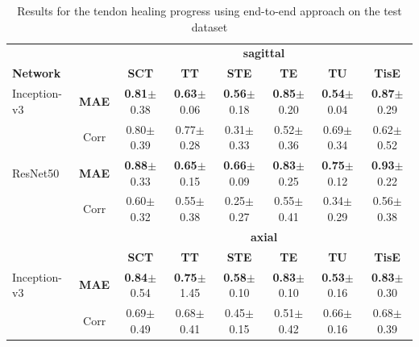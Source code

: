 \begin{table}[h]
	\footnotesize
	\setlength{\tabcolsep}{1pt}
	\centering
	\caption{Results for the tendon healing progress using end-to-end approach on the test dataset}
	\label{cross-validation}
	\vspace{-0.5cm}
	\begin{tabular}{lc||c|c|c|c|c|c}
		& & \multicolumn{6}{c}{\normalsize{\textbf{sagittal}}} \\
		\textbf{Network} & & \textbf{SCT} & \textbf{TT} & \textbf{STE} & \textbf{TE} & \textbf{TU} & \textbf{TisE} \\ \hline
		Inception-v3 & \textbf{MAE} & \textbf{0.81}$\pm$0.38 & \textbf{0.63}$\pm$0.06 & \textbf{0.56}$\pm$0.18 & \textbf{0.85}$\pm$0.20 & \textbf{0.54}$\pm$0.04 & \textbf{0.87}$\pm$0.29 \\
		& Corr & 0.80$\pm$0.39 & 0.77$\pm$0.28 & 0.31$\pm$0.33 & 0.52$\pm$0.36 & 0.69$\pm$0.34 & 0.62$\pm$0.52 \\ \hline
		ResNet50 & \textbf{MAE} & \textbf{0.88}$\pm$0.33 & \textbf{0.65}$\pm$0.15 & \textbf{0.66}$\pm$0.09 & \textbf{0.83}$\pm$0.25 & \textbf{0.75}$\pm$0.12 & \textbf{0.93}$\pm$0.22 \\
		& Corr & 0.60$\pm$0.32 & 0.55$\pm$0.38 & 0.25$\pm$0.27 & 0.55$\pm$0.41 & 0.34$\pm$0.29 & 0.56$\pm$0.38 \\
		\hline \hline
		& & \multicolumn{6}{c}{\normalsize{\textbf{axial}}} \\
		& & \textbf{SCT} & \textbf{TT} & \textbf{STE} & \textbf{TE} & \textbf{TU} & \textbf{TisE}\\ \hline
		Inception-v3 & \textbf{MAE} & \textbf{0.84}$\pm$0.54 & \textbf{0.75}$\pm$1.45 & \textbf{0.58}$\pm$0.10 & \textbf{0.83}$\pm$0.10 & \textbf{0.53}$\pm$0.16 & \textbf{0.83}$\pm$0.30 \\
		& Corr & 0.69$\pm$0.49 & 0.68$\pm$0.41 & 0.45$\pm$0.15 & 0.51$\pm$0.42 & 0.66$\pm$0.16 & 0.68$\pm$0.39 \\ \hline

\end{tabular}
\end{table}
